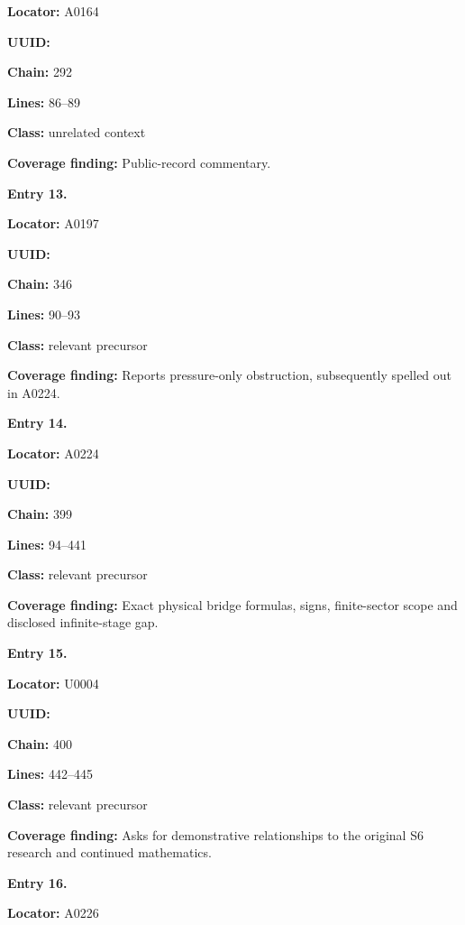 \documentclass[10pt,a4paper,oneside]{report}
\begin{document}
\textbf{Locator:} A0164

\textbf{UUID:} \protect{}

\textbf{Chain:} 292

\textbf{Lines:} 86--89

\textbf{Class:} unrelated context

\textbf{Coverage finding:} Public-record commentary.


\textbf{Entry 13.}

\textbf{Locator:} A0197

\textbf{UUID:} \protect{}

\textbf{Chain:} 346

\textbf{Lines:} 90--93

\textbf{Class:} relevant precursor

\textbf{Coverage finding:} Reports pressure-only obstruction,
subsequently spelled out in A0224.


\textbf{Entry 14.}

\textbf{Locator:} A0224

\textbf{UUID:} \protect{}

\textbf{Chain:} 399

\textbf{Lines:} 94--441

\textbf{Class:} relevant precursor

\textbf{Coverage finding:} Exact physical bridge formulas, signs,
finite-sector scope and disclosed infinite-stage gap.


\textbf{Entry 15.}

\textbf{Locator:} U0004

\textbf{UUID:} \protect{}

\textbf{Chain:} 400

\textbf{Lines:} 442--445

\textbf{Class:} relevant precursor

\textbf{Coverage finding:} Asks for demonstrative relationships to the
original S6 research and continued mathematics.


\textbf{Entry 16.}

\textbf{Locator:} A0226
\end{document}
